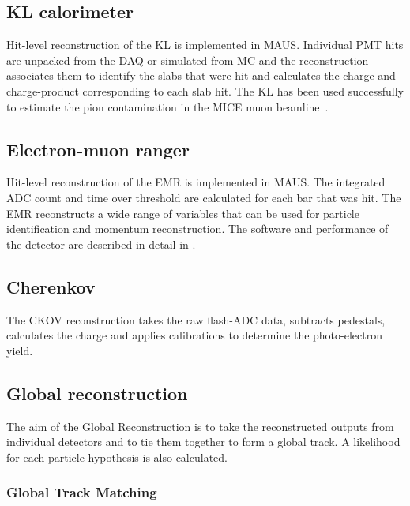 \documentclass{JINST}
\begin{document}
\subsection{KL calorimeter}
Hit-level reconstruction of the KL is  implemented in MAUS.  Individual PMT hits are unpacked from the DAQ or simulated from MC and the reconstruction associates them to identify the slabs that were hit and calculates the charge and charge-product corresponding to each slab hit. The KL has been used successfully to estimate the pion contamination in the MICE muon beamline~\cite{PionContaminationJINST}. 



\subsection{Electron-muon ranger}
Hit-level reconstruction of the EMR is  implemented in MAUS. The integrated ADC count and time over threshold are calculated for each bar that was hit.
The EMR reconstructs a wide range of variables that can be used for particle identification and momentum reconstruction. The  software and  performance of the detector are described in detail in \cite{EMRJINST}. 


\subsection{Cherenkov}
The CKOV reconstruction takes the raw flash-ADC data, subtracts pedestals, calculates the charge and applies calibrations to determine the photo-electron yield. 

\subsection{Global reconstruction}
The aim of the Global Reconstruction is to take the reconstructed outputs from individual detectors and to tie them together to form a global track. A likelihood for each particle hypothesis is also calculated. 

\subsubsection{Global Track Matching}
\end{document}
